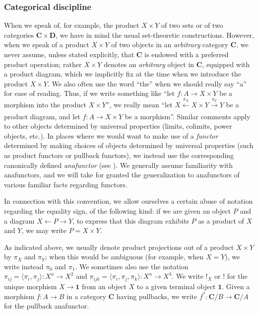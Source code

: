 \documentclass{amsart}
\newcommand\bC{\mathbf{C}}
\newcommand\bD{\mathbf{D}}
\newcommand\br[1]{\langle{}#1\rangle{}}
\newcommand\ot{\leftarrow}
\newcommand\tm{\mathbf{1}}
\newcommand\tox[2][]{\xrightarrow[#1]{#2}}
\newcommand\unex{{!}}
\newcommand\xot[2][]{\xleftarrow[#1]{#2}}
\theoremstyle{definition}
\theoremstyle{remark}
\theoremstyle{plainwithref}
\begin{document}
\subsubsection{Categorical discipline} \label{subsubsec:discipline}
When we speak of, for example, the product \( X \times Y \) of two sets or of two categories \( \bC \times \bD \), we have in mind the usual set-theoretic constructions.
However, when we speak of a product \( X \times Y \) of two objects in an \emph{arbitrary} category \( \bC \), we never assume, unless stated explicitly, that \( \bC \) is endowed with a preferred product operation; rather \( X \times Y \) denotes an \emph{arbitrary} object in \( \bC \), equipped with a product diagram, which we implicitly fix at the time when we introduce the product \( X \times Y \).
We also often use the word ``the'' when we should really say ``a'' for ease of reading.
Thus, if we write something like ``let \( f \colon A \to X \times Y \) be a morphism into the product \( X \times Y \)'', we really mean ``let \( X \xot{\pi_X} X \times Y \tox{\pi_Y} Y \) be a product diagram, and let \( f \colon A \to X \times Y \) be a morphism''.
Similar comments apply to other objects determined by universal properties (limits, colimits, power objects, etc.).
In places where we would want to make use of a \emph{functor} determined by making choices of objects determined by universal properties (such as product functors or pullback functors), we instead use the corresponding canonically defined \emph{anafunctor} (see \cite{makkai-avoiding-choice}).
We generally assume familiarity with anafunctors, and we will take for granted the generalization to anafunctors of various familiar facts regarding functors.

In connection with this convention, we allow ourselves a certain abuse of notation regarding the equality sign, of the following kind: if we are given an object \( P \) and a diagram \( X \ot P \to Y \), to express that this diagram exhibits \( P \) as a product of \( X \) and \( Y \), we may write \( P = X \times Y \).

As indicated above, we usually denote product projections out of a product \( X \times Y \) by \( \pi_X \) and \( \pi_Y \); when this would be ambiguous (for example, when \( X = Y \)), we write instead \( \pi_0 \) and \( \pi_1 \).
We sometimes also use the notation \( \pi_{ij} = \br{\pi_i,\pi_j} \colon X^n \to X^2 \) and \( \pi_{ijk} = \br{\pi_i,\pi_j,\pi_k} \colon X^n \to X^3 \).
We write \( \unex_X \) or \( \unex \) for the unique morphism \( X \to \tm \) from an object \( X \) to a given terminal object \( \tm \).
Given a morphism \( f \colon A \to B \) in a category \( \bC \) having pullbacks, we write \( f^* \colon \bC / B \to \bC / A \) for the pullback anafunctor.
\end{document}

